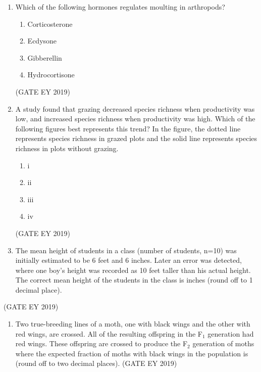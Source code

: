 \documentclass[journal,12pt,onecolumn]{IEEEtran}
\theoremstyle{remark}
\begin{document}
\begin{enumerate}[resume]

\item Which of the following hormones regulates moulting in arthropods?  
\begin{multicols}{2}
\begin{enumerate}
\item Corticosterone  
\item Ecdysone  
\item Gibberellin  
\item Hydrocortisone  
\end{enumerate}
\end{multicols}
\hfill{(GATE EY 2019)}
\item A study found that grazing decreased species richness when productivity was low, and increased species richness when productivity was high. Which of the following figures best represents this trend? In the figure, the dotted line represents species richness in grazed plots and the solid line represents species richness in plots without grazing.  


\begin{multicols}{2}
\begin{enumerate}
\item i  
\item ii  
\item iii  
\item iv  
\end{enumerate}
\end{multicols}
\hfill{(GATE EY 2019)}
\item The mean height of students in a class (number of students, n=10) was initially estimated to be 6 feet and 6 inches. Later an error was detected, where one boy's height was recorded as 10 feet taller than his actual height. The correct mean height of the students in the class is\underline{\hspace{1.5cm}} inches (round off to 1 decimal place).
\end{enumerate}
\hfill{(GATE EY 2019)}



\begin{enumerate}[resume]
\item Two true-breeding lines of a moth, one with black wings and the other with red wings, are crossed. All of the resulting offspring in the F$_1$ generation had red wings. These offspring are crossed to produce the F$_2$ generation of moths where the expected fraction of moths with black wings in the population is \underline{\hspace{1.5cm}}  (round off to two decimal places).
\hfill{(GATE EY 2019)}
\end{enumerate}
\end{document}
